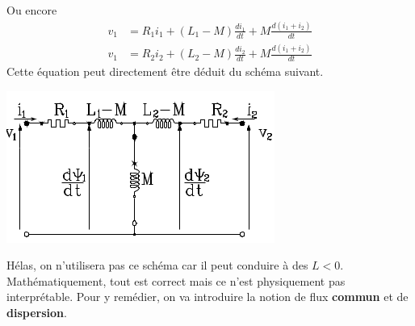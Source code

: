 		Ou encore
		\begin{equation}
		\begin{array}{ll}
		v_1 &= R_1i_1 + (L_1-M)\frac{di_1}{dt} + M\frac{d(i_1+i_2)}{dt}\\
		v_1 &= R_2i_2 + (L_2-M)\frac{di_2}{dt} + M\frac{d(i_1+i_2)}{dt}		
		\end{array}
		\end{equation}
		Cette équation peut directement être déduit du schéma suivant. 
		\begin{center}
				\includegraphics[scale=0.57]{ch3/image9.png}
		\end{center}
		Hélas, on n'utilisera pas ce schéma car il peut conduire à des $L<0$. 
		Mathématiquement, tout est correct mais ce n'est physiquement pas 
		interprétable. Pour y remédier, on va introduire la notion de flux \textbf{commun} 
		et de \textbf{dispersion}.
		
